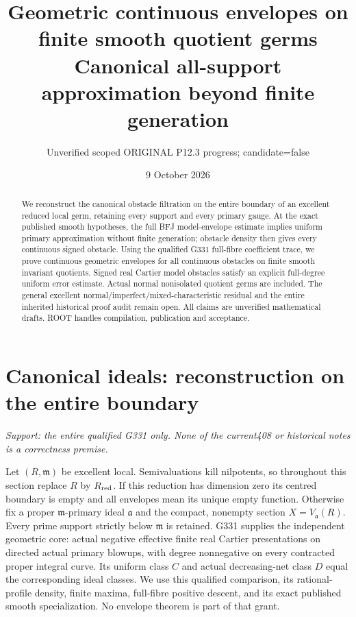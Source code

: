\documentclass[11pt]{article}
\title{Geometric continuous envelopes on finite smooth quotient germs\\Canonical all-support approximation beyond finite generation}
\author{Unverified scoped ORIGINAL P12.3 progress; candidate=false}
\date{9 October 2026}
\begin{document}
\maketitle
\begin{abstract}
We reconstruct the canonical obstacle filtration on the entire boundary of an
excellent reduced local germ, retaining every support and every primary gauge.
At the exact published smooth hypotheses, the full BFJ model-envelope estimate
implies uniform primary approximation without finite generation; obstacle
density then gives every continuous signed obstacle. Using the qualified
G331 full-fibre coefficient trace, we prove continuous geometric envelopes for
all continuous obstacles on finite smooth invariant quotients. Signed real
Cartier model obstacles satisfy an explicit full-degree uniform error estimate.
Actual normal nonisolated quotient germs are included. The general excellent
normal/imperfect/mixed-characteristic residual and the entire inherited
historical proof audit remain open. All claims are unverified mathematical
drafts. ROOT handles compilation, publication and acceptance.
\end{abstract}
\tableofcontents
\newpage
\section{Canonical ideals: reconstruction on the entire boundary}
\label{sec:canonical}
\textit{Support: the entire qualified G331 only. None of the current408 or historical notes is a correctness premise.}

Let $(R,\mathfrak m)$ be excellent local. Semivaluations kill nilpotents, so throughout this section replace $R$ by $R_{\rm red}$. If this reduction has dimension zero its centred boundary is empty and all envelopes mean its unique empty function. Otherwise fix a proper $\mathfrak m$-primary ideal $\mathfrak a$ and the compact, nonempty section $X=V_{\mathfrak a}(R)$. Every prime support strictly below $\mathfrak m$ is retained. G331 supplies the independent geometric core: actual negative effective finite real Cartier presentations on directed actual primary blowups, with degree nonnegative on every contracted proper integral curve. Its uniform class $C$ and actual decreasing-net class $D$ equal the corresponding ideal classes. We use this qualified comparison, its rational-profile density, finite maxima, full-fibre positive descent, and its exact published smooth specialization. No envelope theorem is part of that grant.
\end{document}
